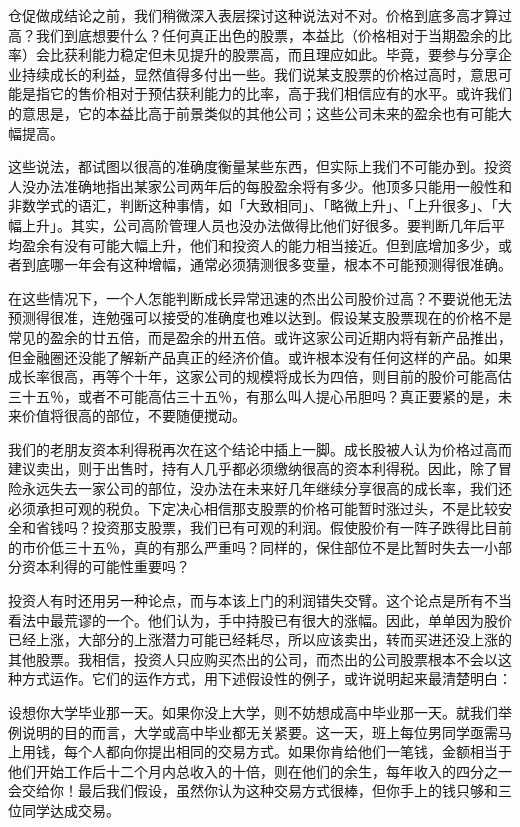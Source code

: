 \documentclass[UTF8,a4paper,zihao=-4,fontset = windows]{ctexart} %
\begin{document}
仓促做成结论之前，我们稍微深入表层探讨这种说法对不对。价格到底多高才算过高？我们到底想要什么？任何真正出色的股票，本益比（价格相对于当期盈余的比率）会比获利能力稳定但未见提升的股票高，而且理应如此。毕竟，要参与分享企业持续成长的利益，显然值得多付出一些。我们说某支股票的价格过高时，意思可能是指它的售价相对于预估获利能力的比率，高于我们相信应有的水平。或许我们的意思是，它的本益比高于前景类似的其他公司；这些公司未来的盈余也有可能大幅提高。

这些说法，都试图以很高的准确度衡量某些东西，但实际上我们不可能办到。投资人没办法准确地指出某家公司两年后的每股盈余将有多少。他顶多只能用一般性和非数学式的语汇，判断这种事情，如「大致相同」、「略微上升」、「上升很多」、「大幅上升」。其实，公司高阶管理人员也没办法做得比他们好很多。要判断几年后平均盈余有没有可能大幅上升，他们和投资人的能力相当接近。但到底增加多少，或者到底哪一年会有这种增幅，通常必须猜测很多变量，根本不可能预测得很准确。

在这些情况下，一个人怎能判断成长异常迅速的杰出公司股价过高？不要说他无法预测得很准，连勉强可以接受的准确度也难以达到。假设某支股票现在的价格不是常见的盈余的廿五倍，而是盈余的卅五倍。或许这家公司近期内将有新产品推出，但金融圈还没能了解新产品真正的经济价值。或许根本没有任何这样的产品。如果成长率很高，再等个十年，这家公司的规模将成长为四倍，则目前的股价可能高估三十五％，或者不可能高估三十五％，有那么叫人提心吊胆吗？真正要紧的是，未来价值将很高的部位，不要随便搅动。

我们的老朋友资本利得税再次在这个结论中插上一脚。成长股被人认为价格过高而建议卖出，则于出售时，持有人几乎都必须缴纳很高的资本利得税。因此，除了冒险永远失去一家公司的部位，没办法在未来好几年继续分享很高的成长率，我们还必须承担可观的税负。下定决心相信那支股票的价格可能暂时涨过头，不是比较安全和省钱吗？投资那支股票，我们已有可观的利润。假使股价有一阵子跌得比目前的市价低三十五％，真的有那么严重吗？同样的，保住部位不是比暂时失去一小部分资本利得的可能性重要吗？

投资人有时还用另一种论点，而与本该上门的利润错失交臂。这个论点是所有不当看法中最荒谬的一个。他们认为，手中持股已有很大的涨幅。因此，单单因为股价已经上涨，大部分的上涨潜力可能已经耗尽，所以应该卖出，转而买进还没上涨的其他股票。我相信，投资人只应购买杰出的公司，而杰出的公司股票根本不会以这种方式运作。它们的运作方式，用下述假设性的例子，或许说明起来最清楚明白：

设想你大学毕业那一天。如果你没上大学，则不妨想成高中毕业那一天。就我们举例说明的目的而言，大学或高中毕业都无关紧要。这一天，班上每位男同学亟需马上用钱，每个人都向你提出相同的交易方式。如果你肯给他们一笔钱，金额相当于他们开始工作后十二个月内总收入的十倍，则在他们的余生，每年收入的四分之一会交给你！最后我们假设，虽然你认为这种交易方式很棒，但你手上的钱只够和三位同学达成交易。
\end{document}

